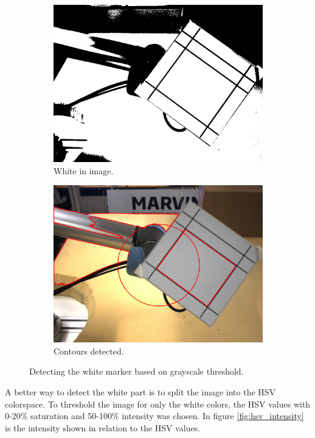 \begin{figure}[H]
 \centering
 \begin{subfigure}{\exampleWidth}
 \includegraphics[width=\linewidth]{graphics/threshold_white}
 \caption{White in image.}
 \end{subfigure}
 \begin{subfigure}{\exampleWidth}
 \includegraphics[width=\linewidth]{graphics/threshold_white_contours}
 \caption{Contours detected.}
 \end{subfigure}
 \caption{Detecting the white marker based on grayscale threshold.}
 \label{fig:threshold_marker1}
\end{figure}

A better way to detect the white part is to split the image into the HSV colorspace.
To threshold the image for only the white colors, the HSV values with 
0-20\% saturation and 50-100\% intensity was chosen.
In figure \ref{fig:hsv_intensity} is the intensity shown in relation to the HSV values.

